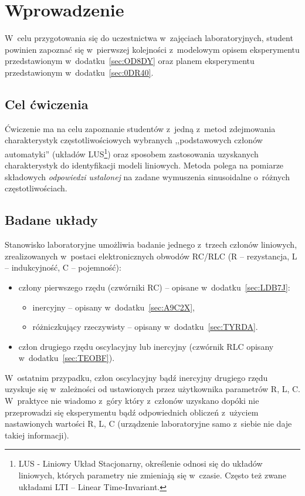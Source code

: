 \documentclass[paper=a4,DIV=12]{lpas}
\begin{document}
\section{Wprowadzenie}
\label{sec:AA9C2}

W~celu przygotowania się do uczestnictwa w~zajęciach laboratoryjnych, student
powinien zapoznać się w~pierwszej kolejności z~modelowym opisem eksperymentu
przedstawionym w~dodatku~\ref{sec:OD8DY} oraz planem eksperymentu
przedstawionym w~dodatku~\ref{sec:0DR40}.

\subsection{Cel ćwiczenia}
\label{sec:7HOCC}

Ćwiczenie ma na celu zapoznanie studentów z~jedną z~metod zdejmowania
charakterystyk częstotliwościowych wybranych ,,podstawowych członów
automatyki'' (układów LUS\footnote{LUS - Liniowy Układ Stacjonarny, określenie
odnosi się do układów liniowych, których parametry nie zmieniają się w~czasie.
Często też zwane układami LTI -- Linear Time-Invariant.}) oraz sposobem
zastosowania uzyskanych charakterystyk do identyfikacji modeli liniowych.
Metoda polega na pomiarze składowych {\em odpowiedzi ustalonej} na zadane
wymuszenia sinusoidalne o~różnych częstotliwościach.


\subsection{Badane układy}
\label{sec:ITWYS}

Stanowisko laboratoryjne umożliwia badanie jednego z~trzech członów liniowych,
zrealizowanych w~postaci elektronicznych obwodów RC/RLC (R -- rezystancja,
L -- indukcyjność, C -- pojemność):
\begin{itemize}
  \item człony pierwszego rzędu (czwórniki RC) -- opisane w~dodatku~\ref{sec:LDB7J}:
    \begin{itemize}
      \item inercyjny -- opisany w~dodatku~\ref{sec:A9C2X},
      \item różniczkujący rzeczywisty -- opisany w~dodatku~\ref{sec:TYRDA}.
    \end{itemize}
  \item człon drugiego rzędu oscylacyjny lub inercyjny (czwórnik RLC opisany w~dodatku~\ref{sec:TEOBF}).
\end{itemize}
W~ostatnim przypadku, człon oscylacyjny bądź inercyjny drugiego rzędu uzyskuje
się w~zależności od ustawionych przez użytkownika parametrów R, L, C.
W~praktyce nie wiadomo z~góry który z~członów uzyskano dopóki nie przeprowadzi
się eksperymentu bądź odpowiednich obliczeń z~użyciem nastawionych wartości R,
L, C (urządzenie laboratoryjne samo z~siebie nie daje takiej informacji).
\end{document}
